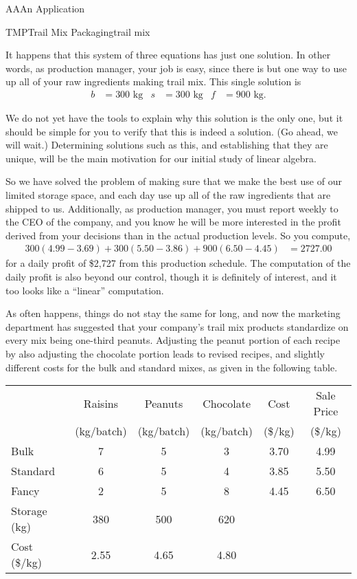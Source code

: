 \begin{subsect}{AA}{An Application}
\begin{example}{TMP}{Trail Mix Packaging}{trail mix}
\begin{para}
\end{para}
%
\begin{para}It happens that this system of three equations has just one solution.  In other words, as production manager, your job is easy, since there is but one way to use up all of your raw ingredients making trail mix.  This single solution is
%
\begin{align*}
b&=300\text{ kg}
&
s&=300\text{ kg}
&
f&=900\text{ kg}.
\end{align*}
\end{para}
%
\begin{para}We do not yet have the tools to explain why this solution is the only one, but it should be simple for you to verify that this is indeed a solution.  (Go ahead, we will wait.)  Determining solutions such as this, and establishing that they are unique, will be the main motivation for our initial study of linear algebra.\end{para}
%
\begin{para}So we have solved the problem of making sure that we make the best use of our limited storage space, and each day use up all of the raw ingredients that are shipped to us.  Additionally, as production manager, you must report weekly to the CEO of the company, and you know he will be more interested in the profit derived from your decisions than in the actual production levels.  So you compute,
%
\begin{align*}
300(4.99-3.69)+300(5.50-3.86)+900(6.50-4.45)&=2727.00
\end{align*}
%
for a daily profit of \$2,727 from this production schedule. The computation of the daily profit is also beyond our control, though it is definitely of interest, and it too looks like a ``linear'' computation.\end{para}
%
\begin{para}As often happens, things do not stay the same for long, and now the marketing department has suggested that your company's trail mix products standardize on every mix being one-third peanuts.  Adjusting the peanut portion of each recipe by also adjusting the chocolate portion leads to revised recipes, and slightly different costs for the bulk and standard mixes, as given in the following table.
%
\begin{center}
\begin{tabular}{l*5{|c}}
&Raisins&Peanuts&Chocolate&Cost&Sale Price\\
&(kg/batch)&(kg/batch)&(kg/batch)&(\$/kg)&(\$/kg)\\\hline\hline
Bulk&7&5&3&3.70&4.99\\\hline
Standard&6&5&4&3.85&5.50\\\hline
Fancy&2&5&8&4.45&6.50\\\hline\hline
Storage (kg)&380&500&620&&\\\hline
Cost (\$/kg)&2.55&4.65&4.80&&
\end{tabular}
\end{center}
\end{para}


\end{example}
\end{subsect}
